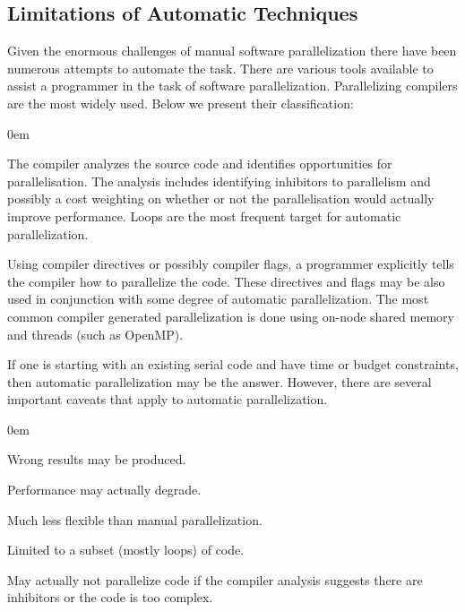 \subsection{Limitations of Automatic Techniques}
\label{background_challenges_automatic}
\quad Given the enormous challenges of manual software parallelization there have been numerous attempts to automate the task. There are various tools available to assist a programmer in the task of software parallelization. Parallelizing compilers are the most widely used. Below we present their classification:
\begin{description}[style=unboxed,leftmargin=0cm,noitemsep]
\itemsep0em
\item[Fully Automatic] The compiler analyzes the source code and identifies opportunities for parallelisation. The analysis includes identifying inhibitors to parallelism and possibly a cost weighting on whether or not the parallelisation would actually improve performance. Loops are the most frequent target for automatic parallelization. 
\item[Programmer Directed] Using compiler directives or possibly compiler flags, a programmer explicitly tells the compiler how to parallelize the code. These directives and flags may be also used in conjunction with some degree of automatic parallelization. The most common compiler generated parallelization is done using on-node shared memory and threads (such as OpenMP).
\end{description}
\quad If one is starting with an existing serial code and have time or budget constraints, then automatic parallelization may be the answer. However, there are several important caveats that apply to automatic parallelization.
\begin{description}[style=unboxed,leftmargin=0cm]
\itemsep0em
\item[Correctness] Wrong results may be produced.
\item[Performance] Performance may actually degrade.
\item[Flexibility] Much less flexible than manual parallelization.
\item[Limitations] Limited to a subset (mostly loops) of code.
\item[Effectiveness] May actually not parallelize code if the compiler analysis suggests there are inhibitors or the code is too complex.
\end{description}
